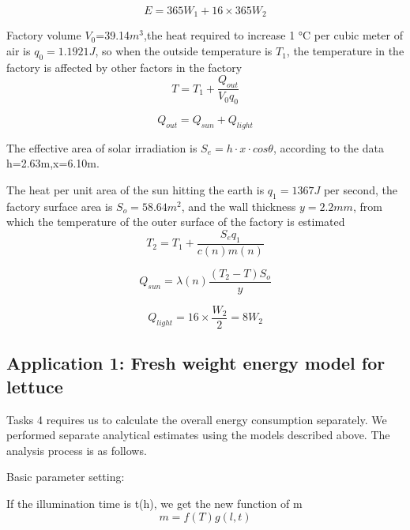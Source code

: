 \begin{equation}\label{e1}
	E=365W_1+16 \times 365W_2
\end{equation}


Factory volume $V_0$=39.14$m^3$,the heat required to increase 1 °C per cubic meter of air is $q_0=1.1921J$, so when the outside temperature is $T_1$, the temperature in the factory is affected by other factors in the factory
\begin{equation}\label{e1}
	T=T_1+\frac{Q_{out}}{V_0q_0}
\end{equation}

\begin{equation}\label{e1}
	Q_{out}=Q_{sun}+Q_{light}
\end{equation}


The effective area of solar irradiation is $S_{e}=h \cdot x \cdot cos\theta$, according to the data  h=2.63m,x=6.10m.

The heat per unit area of the sun hitting the earth is $q_1=1367J$ per second, the factory surface area is $S_{o}=58.64m^2$, and the wall thickness  $y=2.2mm$, from which the temperature of the outer surface of the factory is estimated
\begin{equation}\label{e1}
	T_2=T_1+\frac{S_{e}q_1}{c(n)m(n)}
\end{equation}


\begin{equation}\label{e1}
	Q_{sun}={\lambda}(n)\frac{(T_2-T)S_{o}}{y}
\end{equation}

\begin{equation}\label{e1}
	Q_{light}=16 \times \frac{W_2}{2}=8{W_2}
\end{equation}



\subsection{Application 1: Fresh weight energy model for lettuce}

Tasks 4 requires us to calculate the overall energy consumption separately. We performed separate analytical estimates using the models described above. The analysis process is as follows.


Basic parameter setting:

If the illumination time is t(h), we get the new function of m
\begin{equation}\label{e1}
	m=f(T)g(l,t)
\end{equation}


